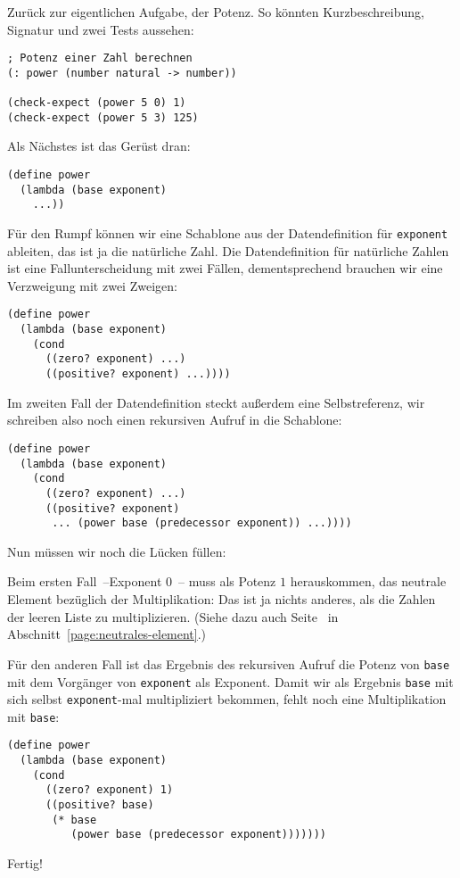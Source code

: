 Zurück zur eigentlichen Aufgabe, der Potenz.  So könnten
Kurzbeschreibung, Signatur und zwei Tests aussehen:\label{function:power}
%
\begin{lstlisting}
; Potenz einer Zahl berechnen
(: power (number natural -> number))

(check-expect (power 5 0) 1)
(check-expect (power 5 3) 125)
\end{lstlisting}
%
Als Nächstes ist das Gerüst dran:
%
\begin{lstlisting}
(define power
  (lambda (base exponent)
    ...))
\end{lstlisting}
%
Für den Rumpf können wir eine Schablone aus der Datendefinition
für \lstinline{exponent} ableiten, das ist ja die natürliche
Zahl.  Die Datendefinition für natürliche Zahlen ist eine
Fallunterscheidung mit zwei Fällen, dementsprechend brauchen wir eine
Verzweigung mit zwei Zweigen:
%
\begin{lstlisting}
(define power
  (lambda (base exponent)
    (cond
      ((zero? exponent) ...)
      ((positive? exponent) ...))))
\end{lstlisting}
%
Im zweiten Fall der Datendefinition steckt außerdem eine
Selbstreferenz, wir schreiben also noch einen rekursiven Aufruf in die
Schablone:
%
\begin{lstlisting}
(define power
  (lambda (base exponent)
    (cond
      ((zero? exponent) ...)
      ((positive? exponent)
       ... (power base (predecessor exponent)) ...))))
\end{lstlisting}
%
Nun müssen wir noch die Lücken füllen:

Beim ersten Fall~--Exponent $0$~-- muss als Potenz $1$ herauskommen, das
neutrale Element bezüglich der Multiplikation: Das ist ja nichts
anderes, als die Zahlen der leeren Liste zu multiplizieren.  (Siehe
dazu auch Seite~\pageref{page:neutrales-element} in
Abschnitt~\ref{page:neutrales-element}.)

Für den anderen Fall ist das Ergebnis des rekursiven Aufruf die Potenz
von \lstinline{base} mit dem Vorgänger von \lstinline{exponent} als
Exponent.  Damit wir als Ergebnis \lstinline{base} mit sich selbst
\lstinline{exponent}-mal multipliziert bekommen, fehlt noch eine
Multiplikation mit \lstinline{base}:
%
\begin{lstlisting}
(define power
  (lambda (base exponent)
    (cond
      ((zero? exponent) 1)
      ((positive? base)
       (* base
          (power base (predecessor exponent)))))))
\end{lstlisting}
%
Fertig!

